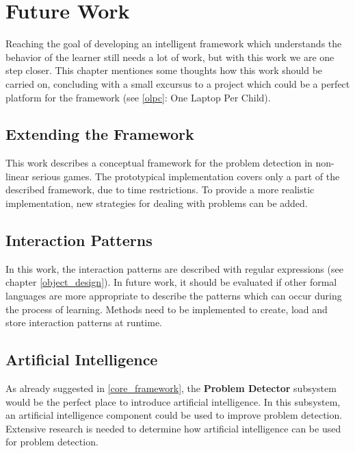 \chapter{Future Work}
\label{future_work}

Reaching the goal of developing an intelligent framework which understands the
behavior of the learner still needs a lot of work, but with this work we are one
step closer. This chapter mentiones some thoughts how this work should be carried
on, concluding with a small excursus to a project which could be a perfect
platform for the framework (see \ref{olpc}: One Laptop Per Child).

\section{Extending the Framework}
This work describes a conceptual framework for the problem detection in non-linear
serious games. The prototypical implementation covers only a part of the described
framework, due to time restrictions. To provide a more realistic implementation,
new strategies for dealing with problems can be added.

\section{Interaction Patterns}
In this work, the interaction patterns are described with regular expressions (see
chapter \ref{object_design}). In future work, it should be evaluated if other
formal languages are more appropriate to describe the patterns which can occur during
the process of learning. Methods need to be implemented to create, load and store
interaction patterns at runtime.

\section{Artificial Intelligence}
As already suggested in \ref{core_framework}, the \textbf{Problem Detector} subsystem
would be the perfect place to introduce artificial intelligence. In this subsystem,
an artificial intelligence component could be used to improve problem detection.
Extensive research is needed to determine how artificial intelligence can be used for problem
detection.

